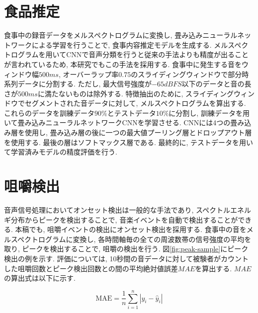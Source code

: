 \section{食品推定}

食事中の録音データをメルスペクトログラムに変換し, 畳み込みニューラルネットワークによる学習を行うことで, 食事内容推定モデルを生成する. メルスペクトログラムを用いてCNNで音声分類を行うと従来の手法よりも精度が出ることが言われているため\cite{Dossou_2021_ICCV}, 本研究でもこの手法を採用する.
食事中に発生する音をウィンドウ幅$500ms$, オーバーラップ率$0.75$のスライディングウィンドウで部分時系列データに分割する. ただし, 最大信号強度が$-65dBFS$以下のデータと音の長さが$500ms$に満たないものは除外する. 特徴抽出のために, スライディングウィンドウでセグメントされた音データに対して, メルスペクトログラムを算出する. これらのデータを訓練データ$90\%$とテストデータ$10\%$に分割し, 訓練データを用いて畳み込みニューラルネットワークCNNを学習させる. CNNには4つの畳み込み層を使用し, 畳み込み層の後に一つの最大値プーリング層とドロップアウト層を使用する. 最後の層はソフトマックス層である. 最終的に, テストデータを用いて学習済みモデルの精度評価を行う.

\section{咀嚼検出}

音声信号処理においてオンセット検出は一般的な手法であり, スペクトルエネルギ分布からピークを検出することで, 音楽イベントを自動で検出することができる. 本稿でも, 咀嚼イベントの検出にオンセット検出を採用する. 食事中の音をメルスペクトログラムに変換し, 各時間軸毎の全ての周波数帯の信号強度の平均を取り, ピークを検出することで, 咀嚼の検出を行う. 図\ref{fig:peak-sample}にピーク検出の例を示す. 評価については, 10秒間の音データに対して被験者がカウントした咀嚼回数とピーク検出回数との間の平均絶対値誤差$MAE$を算出する. $MAE$の算出式は以下に示す.

\begin{equation}
    \text{MAE} = \frac{1}{n} \sum_{i=1}^{n} | y_i - \hat{y}_i |
\end{equation}

